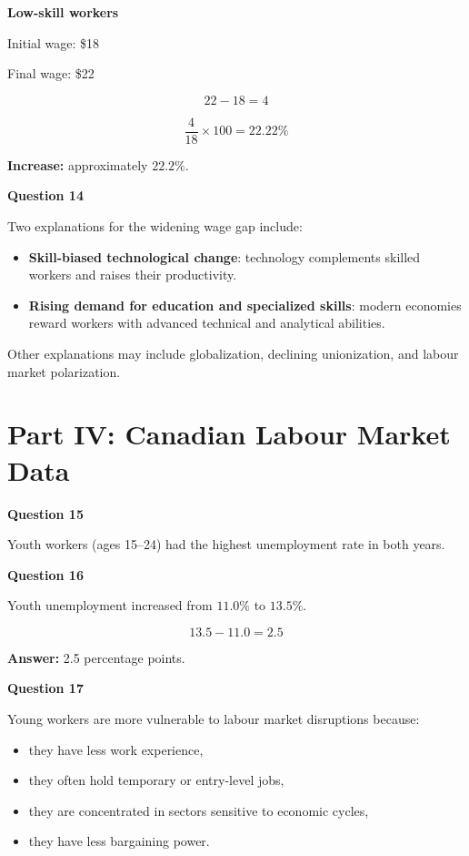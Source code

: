\documentclass[12pt]{article}
\begin{document}
\textbf{Low-skill workers}

Initial wage: \$18

Final wage: \$22

\[
22 - 18 = 4
\]

\[
\frac{4}{18} \times 100 = 22.22\%
\]

\textbf{Increase:} approximately $22.2\%$.

\textbf{Question 14}

Two explanations for the widening wage gap include:

\begin{itemize}
\item \textbf{Skill-biased technological change}: technology complements skilled workers and raises their productivity.
\item \textbf{Rising demand for education and specialized skills}: modern economies reward workers with advanced technical and analytical abilities.
\end{itemize}

Other explanations may include globalization, declining unionization, and labour market polarization.

\section*{Part IV: Canadian Labour Market Data}

\textbf{Question 15}

Youth workers (ages 15--24) had the highest unemployment rate in both years.

\textbf{Question 16}

Youth unemployment increased from $11.0\%$ to $13.5\%$.

\[
13.5 - 11.0 = 2.5
\]

\textbf{Answer:} 2.5 percentage points.

\textbf{Question 17}

Young workers are more vulnerable to labour market disruptions because:

\begin{itemize}
\item they have less work experience,
\item they often hold temporary or entry-level jobs,
\item they are concentrated in sectors sensitive to economic cycles,
\item they have less bargaining power.
\end{itemize}
\end{document}
